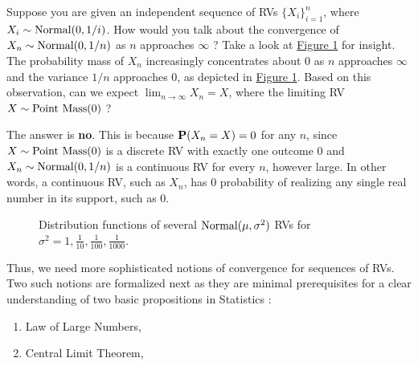 \begin{classwork}\label{CW:Normal01bynConvToPointMass0}
Suppose you are given an independent sequence of RVs $\{X_i \}_{i=1}^n$, where $X_i \sim \mbox{{\rm Normal}}(0,1/i)$.  How would you talk about the convergence of $X_n \sim \mbox{{\rm Normal}}(0,1/n)$ as $n$ approaches $\infty$ ?  Take a look at \hyperref[F:PlotNormal01bynConvToPointMass0]{Figure \ref*{F:PlotNormal01bynConvToPointMass0}} for insight.  The probability mass of $X_n$ increasingly concentrates about $0$ as $n$ approaches $\infty$ and the variance $1/n$ approaches $0$, as depicted in \hyperref[F:PlotNormal01bynConvToPointMass0]{Figure \ref*{F:PlotNormal01bynConvToPointMass0}}.  Based on this observation, can we expect $\lim_{n \rightarrow \infty} X_n = X$, where the limiting RV $X \sim \mbox{{\rm Point~Mass}}(0)$ ?

The answer is {\bf no}.  This is because $\mathbf{P}(X_n=X)=0$ for any $n$, since $X \sim \mbox{{\rm Point~Mass}}(0)$ is a discrete RV with exactly one outcome $0$ and $X_n \sim \mbox{{\rm Normal}}(0,1/n)$ is a continuous RV for every $n$, however large.  In other words, a continuous RV, such as $X_n$, has $0$ probability of realizing any single real number in its support, such as $0$.    
\begin{figure}[htpb]
\caption{Distribution functions of several $\mbox{{\rm Normal}}(\mu,\sigma^2)$ RVs for $\sigma^2 = 1,\frac{1}{10},\frac{1}{100},\frac{1}{1000}$.\label{F:PlotNormal01bynConvToPointMass0}}
\centering   {}
\end{figure}
\end{classwork}

Thus, we need more sophisticated notions of convergence for sequences of RVs.  Two such notions are formalized next as they are minimal prerequisites for a clear understanding of two basic propositions in Statistics :
\begin{enumerate} 
\item Law of Large Numbers,
\item Central Limit Theorem,
\end{enumerate}


